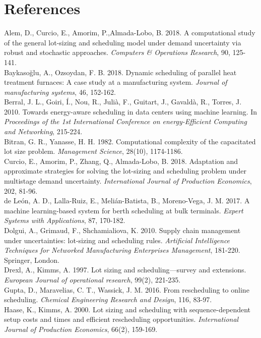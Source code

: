 \documentclass[letterpaper]{article} %
\begin{document}
\section{References}
Alem, D., Curcio, E., Amorim, P.,Almada-Lobo, B. 2018. A computational study of the general lot-sizing and scheduling model under demand uncertainty via robust and stochastic approaches. \textit{Computers \& Operations Research}, 90, 125-141.\\
Baykasoğlu, A., Ozsoydan, F. B. 2018. Dynamic scheduling of parallel heat treatment furnaces: A case study at a manufacturing system. \textit{Journal of manufacturing systems}, 46, 152-162.\\
Berral, J. L., Goiri, Í., Nou, R., Julià, F., Guitart, J., Gavaldà, R., Torres, J. 2010. Towards energy-aware scheduling in data centers using machine learning. In  \textit{Proceedings of the 1st International Conference on energy-Efficient Computing and Networking}, 215-224.\\
Bitran, G. R., Yanasse, H. H. 1982. Computational complexity of the capacitated lot size problem.  \textit{Management Science}, 28(10), 1174-1186.\\
Curcio, E., Amorim, P., Zhang, Q., Almada-Lobo, B. 2018. Adaptation and approximate strategies for solving the lot-sizing and scheduling problem under multistage demand uncertainty.  \textit{International Journal of Production Economics}, 202, 81-96.\\
de León, A. D., Lalla-Ruiz, E., Melián-Batista, B., Moreno-Vega, J. M. 2017. A machine learning-based system for berth scheduling at bulk terminals.  \textit{Expert Systems with Applications}, 87, 170-182.\\
Dolgui, A., Grimaud, F., Shchamialiova, K. 2010. Supply chain management under uncertainties: lot-sizing and scheduling rules.  \textit{Artificial Intelligence Techniques for Networked Manufacturing Enterprises Management}, 181-220. Springer, London.\\
Drexl, A., Kimms, A. 1997. Lot sizing and scheduling—survey and extensions.  \textit{European Journal of operational research}, 99(2), 221-235.\\
Gupta, D., Maravelias, C. T., Wassick, J. M. 2016. From rescheduling to online scheduling.  \textit{Chemical Engineering Research and Design}, 116, 83-97.\\
Haase, K., Kimms, A. 2000. Lot sizing and scheduling with sequence-dependent setup costs and times and efficient rescheduling opportunities.  \textit{International Journal of Production Economics}, 66(2), 159-169.\\
\end{document}
